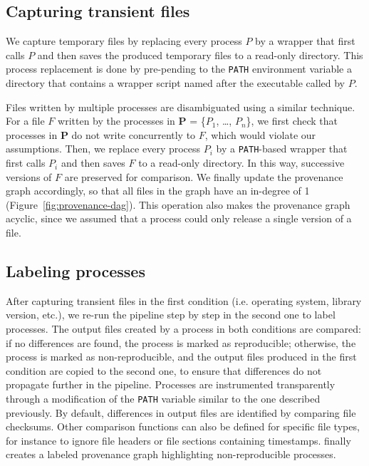 \subsection{Capturing transient files}

We capture temporary files by replacing every
process $P$ by a wrapper that first calls $P$ and then saves the produced
temporary files to a read-only directory. This process replacement is done by pre-pending
 to the \texttt{PATH} environment
variable a directory that contains a wrapper script named after the executable
called by $P$.

Files written by multiple processes are disambiguated using a similar technique. For a
 file $F$ written by the processes in \textbf{P} = \{$P_{1}$, \ldots,
 $P_{n}$\}, we first check that processes in \textbf{P} do not
 write concurrently to $F$, which would violate our assumptions. Then, we
 replace every process $P_{i}$ by a \texttt{PATH}-based wrapper that first
 calls $P_{i}$ and then saves $F$ to a read-only directory. In this way,
 successive versions of $F$ are preserved for comparison. We finally
 update the provenance graph accordingly, so that all files in the graph
 have an in-degree of 1 (Figure~\ref{fig:provenance-dag}). This operation also makes the provenance graph
 acyclic, since we assumed that a process could only release a single version of a file.

\subsection{Labeling processes}

After capturing transient files in the first condition (i.e. operating system, library version, etc.),
we re-run the pipeline
step by step in the second one to label processes. The output files
created by a process in both conditions are compared: if no differences are found, the process is marked as
reproducible; otherwise, the process is marked as non-reproducible, and the
output files produced in the first condition are copied to the second one, to ensure
that differences do not propagate further in the pipeline. Processes are
instrumented transparently through a modification of the \texttt{PATH}
variable similar to the one described previously. By default, differences
in output files are identified by comparing file checksums. Other
comparison functions can also be defined for specific file types, for
instance to ignore file headers or file sections containing timestamps.
\toolname finally creates a labeled
provenance graph highlighting non-reproducible processes.

